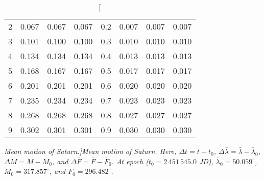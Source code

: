 \begin{table}
\begin{tabular}{rrrr|rrrr}
2 &   0.067 &   0.067 &   0.067 & 0.2 &   0.007 &   0.007 &   0.007\\
3 &   0.101 &   0.100 &   0.100 & 0.3 &   0.010 &   0.010 &   0.010\\
4 &   0.134 &   0.134 &   0.134 & 0.4 &   0.013 &   0.013 &   0.013\\
5 &   0.168 &   0.167 &   0.167 & 0.5 &   0.017 &   0.017 &   0.017\\
6 &   0.201 &   0.201 &   0.201 & 0.6 &   0.020 &   0.020 &   0.020\\
7 &   0.235 &   0.234 &   0.234 & 0.7 &   0.023 &   0.023 &   0.023\\
8 &   0.268 &   0.268 &   0.268 & 0.8 &   0.027 &   0.027 &   0.027\\
9 &   0.302 &   0.301 &   0.301 & 0.9 &   0.030 &   0.030 &   0.030\\
\end{tabular}
\caption[\em Mean motion of Saturn.]{\em Mean motion of Saturn.  Here, $\Delta t = t-t_0$, $\Delta\bar{\lambda} = \bar{\lambda}-\bar{\lambda}_0$,  $\Delta M = M - M_0$, and $\Delta\bar{F} = \bar{F} - \bar{F}_0$.  At epoch  ($t_0 = 2\,451\,545.0$ JD), $\bar{\lambda}_0 = 50.059^\circ$,  $M_0 = 317.857^\circ$, and
$\bar{F}_0 =296.482^\circ$. }\label{vt14}
\end{table}

